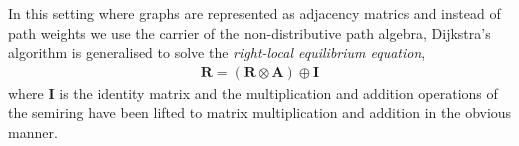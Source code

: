 In this setting where graphs are represented as adjacency matrics and instead of path weights we use the carrier of the non-distributive path algebra, Dijkstra's algorithm is generalised to solve the \emph{right-local equilibrium equation},
\begin{gather*}
\mathbf{R} = (\mathbf{R} \otimes \mathbf{A}) \oplus \mathbf{I}
\end{gather*}
where $\mathbf{I}$ is the identity matrix and the multiplication and addition operations of the semiring have been lifted to matrix multiplication and addition in the obvious manner.

